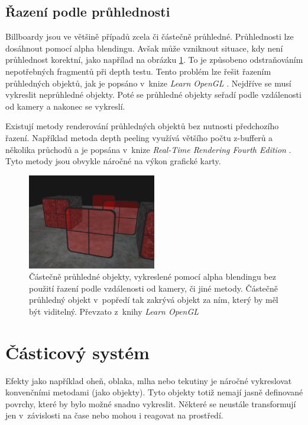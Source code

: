\subsection{Řazení podle průhlednosti}
Billboardy jsou ve většině případů zcela či částečně průhledné. Průhlednosti lze dosáhnout pomocí alpha blendingu. Avšak může vzniknout situace, kdy není průhlednost korektní, jako napřílad na obrázku \ref{fig:incorrect_order_blending}. To je způsobeno odstraňováním nepotřebných fragmentů při depth testu. Tento problém lze řešit řazením průhledných objektů, jak je popsáno v~knize \emph{Learn OpenGL} \cite{de2020learn}. Nejdříve se musí vykreslit neprůhledné objekty. Poté se průhledné objekty seřadí podle vzdálenosti od kamery a nakonec se vykreslí. 


Existují metody renderování průhledných objektů bez nutnosti předchozího řazení. Například metoda depth peeling využívá většího počtu z-bufferů a několika průchodů a je popsána v~knize \emph{Real-Time Rendering Fourth Edition} \cite[kapitola 5.5.1]{ller2018real}. Tyto metody jsou obvykle náročné na výkon grafické karty.  

\begin{figure}[H]
	\centering
	\includegraphics[width=0.5\textwidth]{obrazky-figures/blending_incorrect_order.png}
	\caption{Částečně průhledné objekty, vykreslené pomocí alpha blendingu bez použití řazení podle vzdálenosti od kamery, či jiné metody. Částečně průhledný objekt v~popředí tak zakrývá objekt za ním, který by měl být viditelný. Převzato z~knihy \emph{Learn OpenGL}\cite{de2020learn} }
	\label{fig:incorrect_order_blending}
\end{figure}
\section{Částicový systém}
Efekty jako například oheň, oblaka, mlha nebo tekutiny je náročné vykreslovat konvenčními metodami (jako objekty). Tyto objekty totiž nemají jasně definované povrchy, které by bylo možné snadno vykreslit. Některé se neustále transformují jen v~závislosti na čase nebo mohou i reagovat na prostředí. 

